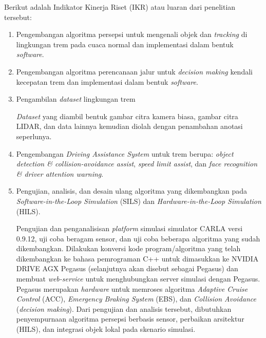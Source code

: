 Berikut adalah Indikator Kinerja Riset (IKR) atau luaran dari penelitian
tersebut:

\begin{enumerate}

    \item Pengembangan algoritma persepsi untuk mengenali objek dan
    \textit{tracking} di lingkungan trem pada cuaca normal dan implementasi
    dalam bentuk \textit{software}.


    \item Pengembangan algoritma perencanaan jalur untuk \textit{decision
    making} kendali kecepatan trem dan implementasi dalam bentuk
    \textit{software}.


    \item Pengambilan \textit{dataset} lingkungan trem

    \textit{Dataset} yang diambil bentuk gambar citra kamera biasa, gambar citra
    LIDAR, dan data lainnya kemudian diolah dengan penambahan anotasi
    seperlunya.

    \item Pengembangan \textit{Driving Assistance System} untuk trem berupa:
    \textit{object detection \& collision-avoidance assist}, \textit{speed limit
    assist}, dan \textit{face recognition \& driver attention warning}.

    \item Pengujian, analisis, dan desain ulang algoritma yang dikembangkan pada
    \textit{Software-in-the-Loop Simulation} (SILS) dan
    \textit{Hardware-in-the-Loop Simulation} (HILS).

    Pengujian dan penganalisisan \textit{platform} simulasi simulator CARLA
    versi 0.9.12, uji coba beragam sensor, dan uji coba beberapa algoritma yang
    sudah dikembangkan. Dilakukan konversi kode program/algoritma yang telah
    dikembangkan ke bahasa pemrograman C++ untuk dimasukkan ke NVIDIA DRIVE AGX
    Pegasus (selanjutnya akan disebut sebagai Pegasus) dan membuat
    \textit{web-service} untuk menghubungkan server simulasi dengan Pegasus.
    Pegasus merupakan \textit{hardware} untuk memroses algoritma
    \textit{Adaptive Cruise Control} (ACC), \textit{Emergency Braking System}
    (EBS), dan \textit{Collision Avoidance} (\textit{decision making}). Dari
    pengujian dan analisis tersebut, dibutuhkan penyempurnaan algoritma persepsi
    berbasis sensor, perbaikan arsitektur (HILS), dan integrasi objek lokal pada
    skenario simulasi.


\end{enumerate}
